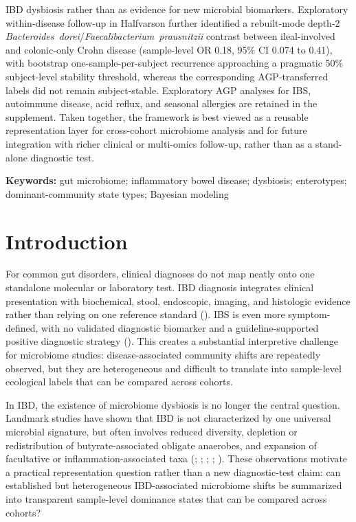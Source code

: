 \documentclass[
  11pt,
]{article}
\newcommand{\taxon}[1]{\emph{#1}}
\begin{document}
IBD dysbiosis rather than as evidence for new microbial biomarkers.
Exploratory within-disease follow-up in Halfvarson further identified a
rebuilt-mode depth-2
\taxon{Bacteroides~dorei}/\taxon{Faecalibacterium~prausnitzii}
contrast between ileal-involved and colonic-only Crohn disease
(sample-level OR 0.18, 95\% CI 0.074 to 0.41), with bootstrap
one-sample-per-subject recurrence approaching a pragmatic 50\%
subject-level stability threshold, whereas the corresponding
AGP-transferred labels did not remain subject-stable.
Exploratory AGP analyses for IBS, autoimmune disease, acid reflux, and
seasonal allergies are retained in the supplement.
Taken together, the framework is best viewed as a reusable
representation layer for cross-cohort microbiome analysis and for future
integration with richer clinical or multi-omics follow-up, rather than
as a stand-alone diagnostic test.

\textbf{Keywords:} gut microbiome; inflammatory bowel disease;
dysbiosis; enterotypes; dominant-community state types; Bayesian
modeling

\section{Introduction}\label{introduction}

For common gut disorders, clinical diagnoses do not map neatly onto one
standalone molecular or laboratory test. IBD diagnosis integrates
clinical presentation with biochemical, stool, \mbox{endoscopic},
imaging, and histologic evidence rather than relying on one reference standard
(). IBS is even more symptom-defined, with no validated diagnostic
biomarker and a guideline-supported positive diagnostic strategy
(). This creates a
substantial interpretive challenge for microbiome studies:
disease-associated community shifts are repeatedly observed, but they are
heterogeneous and difficult to translate into sample-level ecological
labels that can be compared across cohorts.

In IBD, the existence of microbiome dysbiosis is no longer the central
question. Landmark studies have shown that IBD is not characterized by
one universal microbial signature, but often involves reduced diversity,
depletion or redistribution of butyrate-associated obligate anaerobes,
and expansion of facultative or inflammation-associated taxa
(;
;
;
;
). These
observations motivate a practical representation question rather than a
new diagnostic-test claim: can established but heterogeneous
IBD-associated microbiome shifts be summarized into transparent
sample-level dominance states that can be compared across cohorts?
\end{document}
